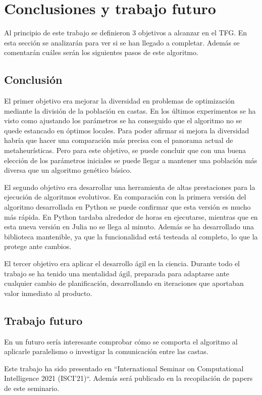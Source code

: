 \chapter{Conclusiones y trabajo futuro}

Al principio de este trabajo se definieron 3 objetivos a alcanzar en el TFG. En esta sección
se analizarán para ver si se han llegado a completar. Además se comentarán cuáles serán
los siguientes pasos de este algoritmo.

\section{Conclusión}
El primer objetivo era mejorar la diversidad en problemas de optimización mediante la división de la población en castas.
En los últimos experimentos se ha visto como ajustando los parámetros se ha conseguido que el algoritmo no se quede estancado
en óptimos locales. Para poder afirmar si mejora la diversidad habría que hacer una comparación más precisa con el panorama actual 
de metaheurísticas. Pero para este objetivo, se puede concluir que con una buena elección de los parámetros iniciales se 
puede llegar a mantener una población más diversa que un algoritmo genético básico.

El segundo objetivo era desarrollar una herramienta de altas prestaciones para la ejecución de algoritmos evolutivos. En comparación
con la primera versión del algoritmo desarrollada en Python se puede confirmar que esta versión es mucho más rápida. En Python tardaba alrededor
de horas en ejecutarse, mientras que en esta nueva versión en Julia no se llega al minuto. Además se ha desarrollado una biblioteca mantenible,
ya que la funcionalidad está testeada al completo, lo que la protege ante cambios.

El tercer objetivo era aplicar el desarrollo ágil en la ciencia. Durante todo el trabajo se ha tenido una mentalidad ágil, preparada para adaptarse ante 
cualquier cambio de planificación, desarrollando en iteraciones que aportaban valor inmediato al producto.

\section{Trabajo futuro}

En un futuro sería interesante comprobar cómo se comporta el algoritmo al aplicarle paralelismo o investigar la comunicación entre las castas. 

Este trabajo ha sido presentado en ``International Seminar on Computational Intelligence 2021 (ISCI'21)``. Además será publicado 
en la recopilación de papers de este seminario.